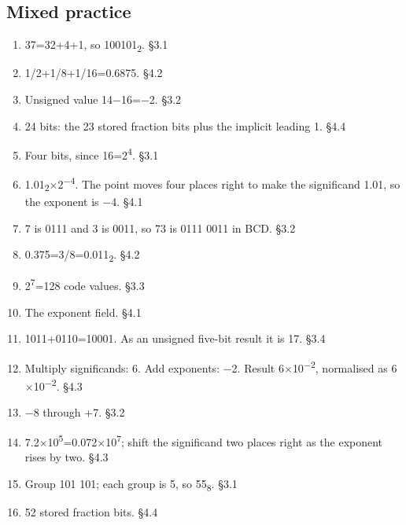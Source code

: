 \documentclass[11pt]{article}
\begin{document}
\begin{keepsection}\subsection{Mixed practice}

\begin{enumerate}
\item 37=32+4+1, so 100101\textsubscript{2}. \hfill{\small\color{FAUblue}§3.1}
\item 1/2+1/8+1/16=0.6875. \hfill{\small\color{FAUblue}§4.2}
\item Unsigned value 14\ensuremath{-}16=\ensuremath{-}2. \hfill{\small\color{FAUblue}§3.2}
\item 24 bits: the 23 stored fraction bits plus the implicit leading 1. \hfill{\small\color{FAUblue}§4.4}
\item Four bits, since 16=2\textsuperscript{4}. \hfill{\small\color{FAUblue}§3.1}
\item 1.01\textsubscript{2}\ensuremath{\times}2\textsuperscript{\ensuremath{-}4}. The point moves four places right to make the significand 1.01, so the exponent is \ensuremath{-}4. \hfill{\small\color{FAUblue}§4.1}
\item 7 is 0111 and 3 is 0011, so 73 is 0111 0011 in BCD. \hfill{\small\color{FAUblue}§3.2}
\item 0.375=3/8=0.011\textsubscript{2}. \hfill{\small\color{FAUblue}§4.2}
\item 2\textsuperscript{7}=128 code values. \hfill{\small\color{FAUblue}§3.3}
\item The exponent field. \hfill{\small\color{FAUblue}§4.1}
\item 1011+0110=10001. As an unsigned five-bit result it is 17. \hfill{\small\color{FAUblue}§3.4}
\item Multiply significands: 6. Add exponents: \ensuremath{-}2. Result 6\ensuremath{\times}10\textsuperscript{\ensuremath{-}2}, normalised as 6\ensuremath{\times}10\textsuperscript{\ensuremath{-}2}. \hfill{\small\color{FAUblue}§4.3}
\item \ensuremath{-}8 through +7. \hfill{\small\color{FAUblue}§3.2}
\item 7.2\ensuremath{\times}10\textsuperscript{5}=0.072\ensuremath{\times}10\textsuperscript{7}; shift the significand two places right as the exponent rises by two. \hfill{\small\color{FAUblue}§4.3}
\item Group 101 101; each group is 5, so 55\textsubscript{8}. \hfill{\small\color{FAUblue}§3.1}
\item 52 stored fraction bits. \hfill{\small\color{FAUblue}§4.4}

\end{enumerate}
\end{keepsection}
\end{document}
